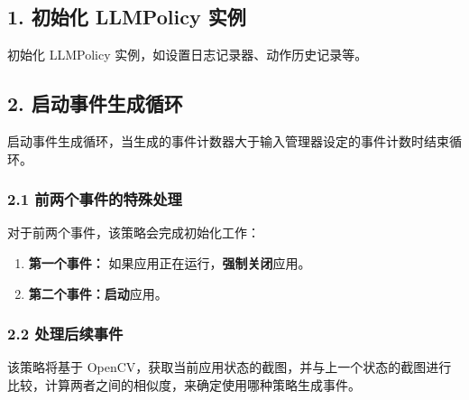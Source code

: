 \documentclass[UTF8, fontset=windows]{article}
\begin{document}
\subsection*{1. 初始化 LLMPolicy 实例}
初始化 LLMPolicy 实例，如设置日志记录器、动作历史记录等。

\subsection*{2. 启动事件生成循环}
启动事件生成循环，当生成的事件计数器大于输入管理器设定的事件计数时结束循环。

\subsubsection*{2.1 前两个事件的特殊处理}
对于前两个事件，该策略会完成初始化工作：
\begin{enumerate}[leftmargin=2em]
    \item \textbf{第一个事件：} 如果应用正在运行，\textbf{强制关闭}应用。
    \item \textbf{第二个事件：}\textbf{启动}应用。
\end{enumerate}

\subsubsection*{2.2 处理后续事件}
该策略将基于 OpenCV，获取当前应用状态的截图，并与上一个状态的截图进行比较，计算两者之间的相似度，来确定使用哪种策略生成事件。
\end{document}
